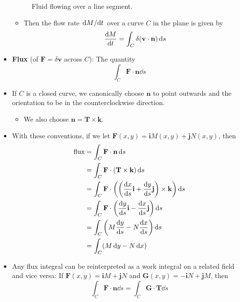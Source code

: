 \documentclass[../main.tex]{subfiles}
\begin{document}
\begin{itemize}
\begin{figure}[h!]
        \caption{Fluid flowing over a line segment.}
        \label{fig:fluidLineSegment}
    \end{figure}
    \begin{itemize}
        \item Then the flow rate $\dv*{M}{t}$ over a curve $C$ in the plane is given by
        \begin{equation*}
            \dv{M}{t} = \int_C\delta(\mathbf{v}\cdot\mathbf{n})\dd{s}
        \end{equation*}
    \end{itemize}
    \item \textbf{Flux} (of $\mathbf{F}=\delta\mathbf{v}$ across $C$): The quantity
    \begin{equation*}
        \int_C\mathbf{F}\cdot\mathbf{n}\dd{s}
    \end{equation*}
    \item If $C$ is a closed curve, we canonically choose $\mathbf{n}$ to point outwards and the orientation to be in the counterclockwise direction.
    \begin{itemize}
        \item We also choose $\mathbf{n}=\mathbf{T}\times\mathbf{k}$.
    \end{itemize}
    \item With these conventions, if we let $\mathbf{F}(x,y)=\mathbf{i}M(x,y)+\mathbf{j}N(x,y)$, then
    \begin{align*}
        \text{flux} &= \int_C\mathbf{F}\cdot\mathbf{n}\dd{s}\\
        &= \int_C\mathbf{F}\cdot(\mathbf{T}\times\mathbf{k})\dd{s}\\
        &= \int_C\mathbf{F}\cdot\left( \left( \dv{x}{s}\mathbf{i}+\dv{y}{s}\mathbf{j} \right)\times\mathbf{k} \right)\dd{s}\\
        &= \int_C\mathbf{F}\cdot\left( \dv{y}{s}\mathbf{i}-\dv{x}{s}\mathbf{j} \right)\dd{s}\\
        &= \int_C\left( M\dv{y}{s}-N\dv{x}{s} \right)\dd{s}\\
        &= \int_C(M\dd{y}-N\dd{x})
    \end{align*}
    \item Any flux integral can be reinterpreted as a work integral on a related field and vice versa: If $\mathbf{F}(x,y)=\mathbf{i}M+\mathbf{j}N$ and $\mathbf{G}(x,y)=-\mathbf{i}N+\mathbf{j}M$, then
    \begin{equation*}
        \int_C\mathbf{F}\cdot\mathbf{n}\dd{s} = \int_C\mathbf{G}\cdot\mathbf{T}\dd{s}
    \end{equation*}
\end{itemize}
\end{document}
